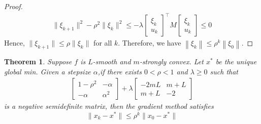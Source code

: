 \documentclass[11pt,a4paper]{article}
\newtheorem{theorem}{Theorem}
\begin{document}
\begin{proof}
\begin{equation}
    \begin{aligned}
        \|\xi_{k+1}\|^2-\rho^2\|\xi_k\|^2\leq -\lambda\left[\begin{array}{l}
            \xi_{k} \\
            u_{k}
        \end{array}\right]^{\top}
        M
            \left[\begin{array}{l}
                \xi_{k} \\
                u_{k}
            \end{array}\right]\leq 0
    \end{aligned}
    \nonumber
\end{equation}
Hence, $\|\xi_{k+1}\|\leq \rho\|\xi_k\|$ for all $k$. Therefore, we have $\left\|\xi_{k}\right\| \leq \rho^{k}\left\|\xi_{0}\right\|$.
\end{proof}


\begin{theorem}
    Suppose $f$ is $L$-smooth and $m$-strongly convex. Let $x^*$ be the unique global
    min. Given a stepsize $\alpha$,if there exists $0<\rho<1$ and $\lambda\geq 0$ such that
    \begin{equation}
        \begin{aligned}
            \begin{bmatrix}
                1-\rho^2&	-\alpha\\
                -\alpha&	\alpha^2
            \end{bmatrix}+\lambda \begin{bmatrix}
                -2mL&	m+L\\
                m+L&	-2
            \end{bmatrix}
        \end{aligned}
        \nonumber
    \end{equation}
    is a negative semidefinite matrix, then the gradient method satisfies $$\|x_k-x^*\|\leq \rho^k\|x_0-x^*\|$$
\end{theorem}
\end{document}
